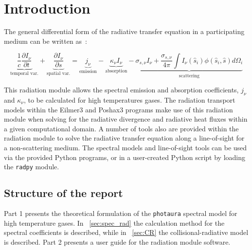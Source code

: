 \chapter{Introduction}

The general differential form of the radiative transfer equation in a participating medium can be written as~\cite{Mod03}:

 \begin{equation}
  \underbrace{ \frac{1}{c} \frac{ \partial I_\nu }{ \partial t } }_\text{temporal var.} + \underbrace{\frac{ \partial I_\nu }{ \partial s }}_\text {spatial var.} = \underbrace{j_\nu}_\text{emission} - \underbrace{\kappa_\nu I_\nu}_\text{absorption} - \underbrace{ \sigma_{s,\nu} I_\nu + \frac{\sigma_{s,\nu}}{4 \pi} \int I_\nu ( \hat{s}_i ) \phi ( \hat{s}_i, \hat{s} ) d \Omega_i }_\text{scattering} \label{eq:RTE}
 \end{equation}
 
 \noindent This radiation module allows the spectral emission and absorption coefficients, $j_\nu$ and $\kappa_\nu$, to be calculated for high temperatures gases.
 The radiation transport models within the Eilmer3 and Poshax3 programs make use of this radiation module when solving for the radiative divergence and radiative heat fluxes within a given computational domain.
 A number of tools also are provided within the radiation module to solve the radiative transfer equation along a line-of-sight for a non-scattering medium.
 The spectral models and line-of-sight tools can be used via the provided Python programs, or in a user-created Python script by loading the \texttt{radpy} module.

\section{Structure of the report}

Part 1 presents the theoretical formulation of the \texttt{photaura} spectral model for high temperature gases.
In \textsection~\ref{sec:spec_rad} the calculation method for the spectral coefficients is described, while in \textsection~\ref{sec:CR} the collisional-radiative model is described.
Part 2 presents a user guide for the radiation module software.  
